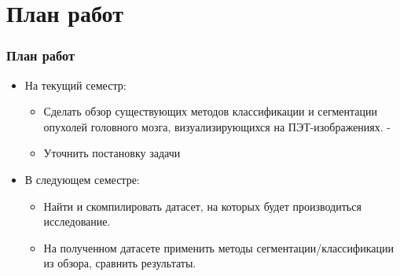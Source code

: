 \usepackage{bbding}

\section{План работ}
\begin{frame}
    \frametitle{План работ}
    \begin{itemize}
        \item На текущий семестр:
            \begin{itemize}
                \item Сделать обзор существующих методов классификации и сегментации опухолей головного мозга,
                визуализирующихся на ПЭТ-изображениях. - \Checkmark
                \item Уточнить постановку задачи
            \end{itemize}
        \item В следующем семестре:
            \begin{itemize}
                \item Найти и скомпилировать датасет, на которых будет производиться исследование.
                \item На полученном датасете применить методы сегментации/классификации из обзора, 
                сравнить результаты.
            \end{itemize}
    \end{itemize}
\end{frame}

\begin{frame}
    \begin{center}
    \end{center}
\end{frame}